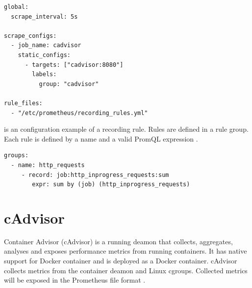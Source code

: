 \begin{lstlisting}[label=lst:04_prom_config_example, caption=Prometheus configuration file example]
global:
  scrape_interval: 5s

scrape_configs:
  - job_name: cadvisor
    static_configs:
      - targets: ["cadvisor:8080"]
        labels:
          group: "cadvisor"
          
rule_files:
  - "/etc/prometheus/recording_rules.yml"
\end{lstlisting}

 is an configuration example of a recording rule.
Rules are defined in a rule group. Each rule is defined by a name and a valid PromQL expression \cite{Prom2020Docs}.

\begin{lstlisting}[label=lst:04_prom_config_rule-example, caption=Prometheus rules configuration file example]
groups:
  - name: http_requests
     - record: job:http_inprogress_requests:sum
        expr: sum by (job) (http_inprogress_requests)
\end{lstlisting}


\section{cAdvisor}
Container Advisor (cAdvisor) is a running deamon that collects, aggregates, analyses and exposes performance metrics from running containers.
It has native support for Docker container and is deployed as a Docker container.
cAdvisor collects metrics from the container deamon and Linux cgroups.
Collected metrics will be exposed in the Prometheus file format \cite{Bastos2019Prom, cadvisor2020Docs}.


